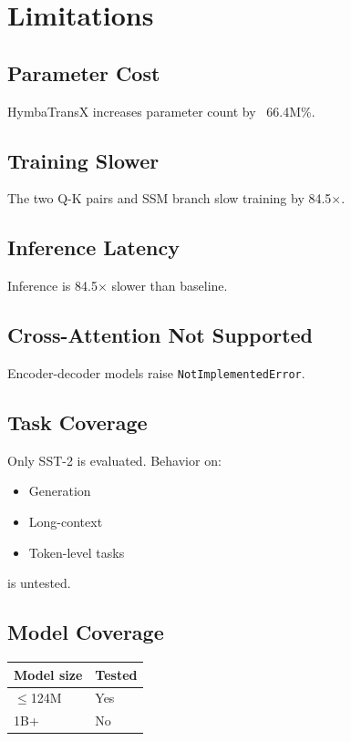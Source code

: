 \section{Limitations}

\subsection{Parameter Cost}

HymbaTransX increases parameter count by ~66.4M\%.

\subsection{Training Slower}

The two Q-K pairs and SSM branch slow training by 84.5$\times$.

\subsection{Inference Latency}

Inference is 84.5$\times$ slower than baseline.

\subsection{Cross-Attention Not Supported}

Encoder-decoder models raise \texttt{NotImplementedError}.

\subsection{Task Coverage}

Only SST-2 is evaluated. Behavior on:
\begin{itemize}
\item Generation
\item Long-context
\item Token-level tasks

\end{itemize}
is untested.

\subsection{Model Coverage}

\begin{table}[H]
\centering
\small
\begin{tabular}{ll}
\toprule
\textbf{Model size} & \textbf{Tested} \\
\midrule
$\le$124M & Yes \\
1B+ & No \\
\bottomrule
\end{tabular}
\end{table}

